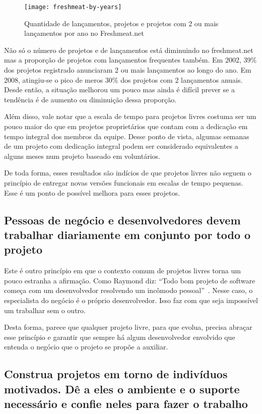 \begin{figure}
  \centering
  \texttt{[image: freshmeat-by-years]}
  \caption{Quantidade de lançamentos, projetos e projetos com 2 ou
    mais lançamentos por ano no Freshmeat.net}
  \label{fig:freshmeat-by-years}
\end{figure}

Não só o número de projetos e de lançamentos está diminuindo no
freshmeat.net mas a proporção de projetos com lançamentos frequentes
também. Em 2002, 39\% dos projetos registrado anunciaram 2 ou mais
lançamentos ao longo do ano. Em 2008, atingiu-se o pico de meros 30\%
dos projetos com 2 lançamentos anuais. Desde então, a situação
melhorou um pouco mas ainda é difícil prever se a tendência é de
aumento ou diminuição dessa proporção.

Além disso, vale notar que a escala de tempo para projetos livres
costuma ser um pouco maior do que em projetos proprietários que contam
com a dedicação em tempo integral dos membros da equipe. Desse ponto
de vista, algumas semanas de um projeto com dedicação integral podem
ser considerado equivalentes a alguns meses num projeto baseado em
voluntários.

De toda forma, esses resultados são indícios de que projetos livres
não seguem o princípio de entregar novas versões funcionais em escalas
de tempo pequenas. Esse é um ponto de possível melhora para esses
projetos.

\subsection[Trabalhar com pessoas de negócio]{Pessoas de negócio e
  desenvolvedores devem trabalhar diariamente em conjunto por todo o
  projeto}

Este é outro princípio em que o contexto comum de projetos livres
torna um pouco estranha a afirmação. Como Raymond diz: ``Todo bom
projeto de software começa com um desenvolvedor resolvendo um incômodo
pessoal''~\cite{Raymond1999}. Nesse caso, o especialista do negócio é
o próprio desenvolvedor. Isso faz com que seja impossível um trabalhar
sem o outro.

Desta forma, parece que qualquer projeto livre, para que evolua,
precisa abraçar esse princípio e garantir que sempre há algum
desenvolvedor envolvido que entenda o negócio que o projeto se propõe
a auxiliar.

\subsection[Trabalhar com indivíduos motivados]{ Construa projetos em
  torno de indivíduos motivados.  Dê a eles o ambiente e o suporte
  necessário e confie neles para fazer o trabalho}

